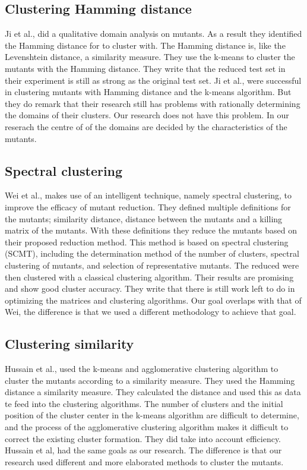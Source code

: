 \documentclass[../main]{subfiles}
\begin{document}
\subsection{Clustering Hamming distance}
Ji et al., did a qualitative domain analysis on mutants\cite{Ji2009}.
As a result they identified the Hamming distance for to cluster with. 
The Hamming distance is, like the Levenshtein distance, a similarity measure.
They use the k-means to cluster the mutants with the Hamming distance.
They write that the reduced test set in their experiment is still as strong as the original test set\cite{Ji2009}.
Ji et al., were successful in clustering mutants with Hamming distance and the k-means algorithm.
But they do remark that their research still has problems with rationally determining the domains of their clusters.
Our research does not have this problem.
In our reserach the centre of of the domains are decided by the characteristics of the mutants.

\subsection{Spectral clustering}
Wei et al., makes use of an intelligent technique, namely spectral clustering, to improve the efficacy of mutant reduction\cite{Wei2021SpectralTesting}.
They defined multiple definitions for the mutants; similarity distance, distance between the mutants and a killing matrix of the mutants.
With these definitions they reduce the mutants based on their proposed reduction method.
This method is based on spectral clustering (SCMT), including the determination method of the number of clusters, spectral clustering of mutants, and selection of representative mutants.
The reduced were then clustered with a classical clustering algorithm.
Their results are promising and show good cluster accuracy.
They write that there is still work left to do in optimizing the matrices and clustering algorithms.
Our goal overlaps with that of Wei, the difference is that we used a different methodology to achieve that goal.

\subsection{Clustering similarity}
Hussain et al., used the k-means and agglomerative clustering algorithm to cluster the mutants according to a similarity measure. 
They used the Hamming distance a similarity measure.
They calculated the distance and used this as data te feed into the clustering algorithms.
The number of clusters and the initial position of the cluster center in the k-means algorithm are difficult to determine, and the process of the agglomerative clustering algorithm makes it difficult to correct the existing cluster formation\cite{Hussain2008}.
They did take into account efficiency.
Hussain et al, had the same goals as our research. 
The difference is that our research used different and more elaborated methods to cluster the mutants.
\end{document}
